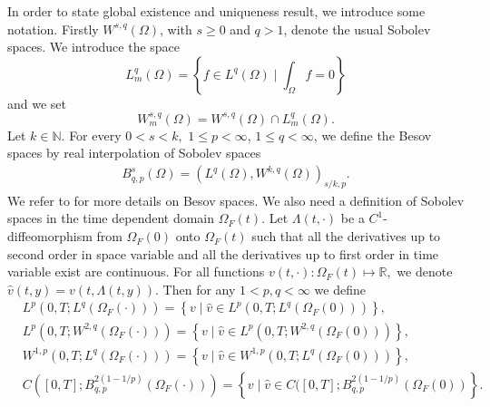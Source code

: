 \documentclass[12pt,a4paper,reqno]{amsart}
\theoremstyle{definition}
\theoremstyle{remark}
\numberwithin{equation}{section}
\newcommand{\oft}{\Omega_{F}(t)}
\newcommand{\ofo}{\Omega_{F}(0)}
\begin{document}
In order to state global existence and uniqueness result, we introduce some notation. Firstly
$W^{s,q}(\Omega)$, with $s\geqslant 0$ and $q>1$, denote the usual Sobolev spaces.
We introduce the space
\[ L^{q}_{m}(\Omega) = \left\{ f \in L^{q}(\Omega) \mid  \int_{\Omega} f  = 0 \right\} \]
and we set
\[ W^{s,q}_{m}(\Omega) = W^{s,q}(\Omega) \cap L^{q}_{m}(\Omega).  \]
 Let $k \in \mathbb{N}$.
For every $0 < s < k, $ $1\leqslant p < \infty$, $1\leqslant q < \infty$, we define the Besov spaces by real interpolation of Sobolev spaces
\begin{align*}
B^{s}_{q,p}(\Omega) = (L^{q}(\Omega), W^{k,q}(\Omega))_{s/k,p}.
\end{align*}
We refer to \cite{Triebel-2} for more details on Besov spaces.  We also need a definition of Sobolev spaces in the time dependent domain $\Omega_{F}(t)$. Let $\Lambda(t,\cdot)$ be a $C^{1}$-diffeomorphism from $\ofo$ onto $\oft$ such that all the derivatives up to second order in space variable and all the derivatives up to first order in time variable exist are continuous. For all functions $v(t,\cdot) : \oft \mapsto \mathbb{R},$ we denote $\widehat v(t,y) = v(t, \Lambda(t,y)).$ Then for any $1 < p,q < \infty$  we define
\begin{align*}
&L^{p}(0,T;L^{q}(\Omega_{F}(\cdot))) = \left\{ v  \mid \widehat v \in L^{p}(0,T;L^{q}(\ofo))\right\}, \\
&L^{p}(0,T;W^{2,q}(\Omega_{F}(\cdot))) = \left\{ v  \mid \widehat v \in L^{p}(0,T;W^{2,q}(\ofo))\right\}, \\
&W^{1,p}(0,T;L^{q}(\Omega_{F}(\cdot))) = \left\{ v  \mid \widehat v \in W^{1,p}(0,T;L^{q}(\ofo))\right\}, \\
&C([0,T];B^{2(1-1/p)}_{q,p}(\Omega_{F}(\cdot))) = \left\{ v  \mid \widehat v \in C([0,T];B^{2(1-1/p)}_{q,p}(\ofo)\right\}.
\end{align*}
\end{document}
